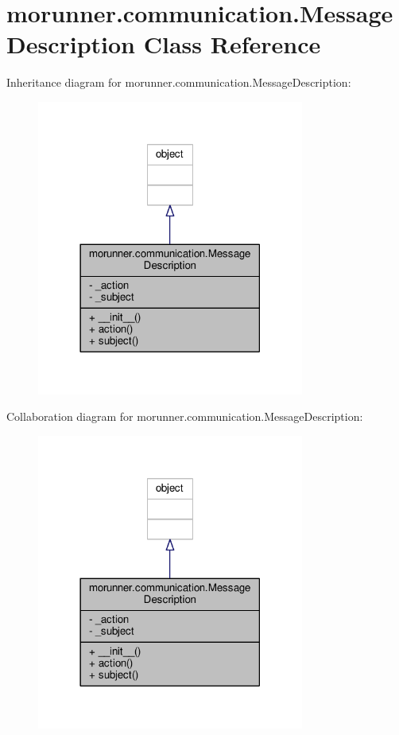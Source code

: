 \hypertarget{classmorunner_1_1communication_1_1MessageDescription}{}\section{morunner.\+communication.\+Message\+Description Class Reference}
\label{classmorunner_1_1communication_1_1MessageDescription}


Inheritance diagram for morunner.\+communication.\+Message\+Description\+:
\nopagebreak
\begin{figure}[H]
\begin{center}
\leavevmode
\includegraphics[width=249pt]{classmorunner_1_1communication_1_1MessageDescription__inherit__graph}
\end{center}
\end{figure}


Collaboration diagram for morunner.\+communication.\+Message\+Description\+:
\nopagebreak
\begin{figure}[H]
\begin{center}
\leavevmode
\includegraphics[width=249pt]{classmorunner_1_1communication_1_1MessageDescription__coll__graph}
\end{center}
\end{figure}

